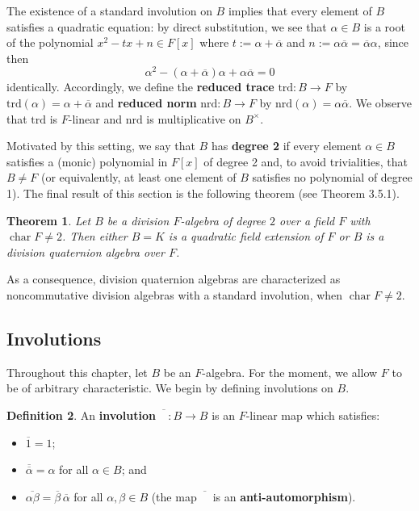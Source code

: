 \documentclass{article}
\newtheorem{theorem}{Theorem}[section]
\theoremstyle{definition}
\newtheorem{definition}[theorem]{Definition}
\begin{document}
The existence of a standard involution on $B$ implies that every element of $B$ satisfies a quadratic equation: by direct substitution, we see that $\alpha \in B$ is a root of the polynomial $x^2 - tx + n \in F[x]$ where $t := \alpha + \overline{\alpha}$ and $n := \alpha\overline{\alpha} = \overline{\alpha}\alpha$, since then
$$\alpha^2 - (\alpha + \overline{\alpha})\alpha + \alpha\overline{\alpha} = 0$$
identically. Accordingly, we define the \textbf{reduced trace} $\text{trd}: B \rightarrow F$ by $\text{trd}(\alpha) = \alpha + \overline{\alpha}$ and \textbf{reduced norm} $\text{nrd}: B \rightarrow F$ by $\text{nrd}(\alpha) = \alpha\overline{\alpha}$. We observe that $\text{trd}$ is $F$-linear and $\text{nrd}$ is multiplicative on $B^\times$.

Motivated by this setting, we say that $B$ has \textbf{degree 2} if every element $\alpha \in B$ satisfies a (monic) polynomial in $F[x]$ of degree 2 and, to avoid trivialities, that $B \neq F$ (or equivalently, at least one element of $B$ satisfies no polynomial of degree 1). The final result of this section is the following theorem (see Theorem 3.5.1).

\begin{theorem}
\label{thm:3.1.1}
Let $B$ be a division $F$-algebra of degree $2$ over a field $F$ with $\operatorname{char} F \neq 2$. Then either $B = K$ is a quadratic field extension of $F$ or $B$ is a division quaternion algebra over $F$.
\end{theorem}

As a consequence, division quaternion algebras are characterized as noncommutative division algebras with a standard involution, when $\operatorname{char} F \neq 2$.

\subsection{Involutions}

Throughout this chapter, let $B$ be an $F$-algebra. For the moment, we allow $F$ to be of arbitrary characteristic. We begin by defining involutions on $B$.

\begin{definition}
An \textbf{involution} $\overline{\phantom{B}} : B \rightarrow B$ is an $F$-linear map which satisfies:
\begin{itemize}
  \item[(i)] $\overline{1} = 1$;
  \item[(ii)] $\overline{\overline{\alpha}} = \alpha$ for all $\alpha \in B$; and
  \item[(iii)] $\overline{\alpha\beta} = \overline{\beta}\,\overline{\alpha}$ for all $\alpha, \beta \in B$ (the map $\overline{\phantom{B}}$ is an \textbf{anti-automorphism}).
\end{itemize}
\end{definition}
\end{document}

